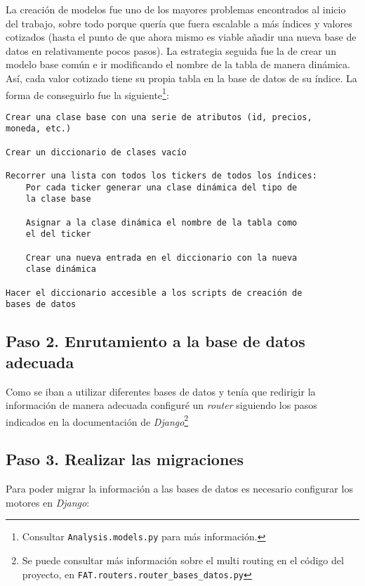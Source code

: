 La creación de modelos fue uno de los mayores problemas encontrados al inicio del trabajo, sobre todo porque quería que  fuera escalable a más índices y valores cotizados (hasta el punto de que ahora mismo es viable añadir una nueva base de datos en relativamente pocos pasos). La estrategia seguida fue la de crear un modelo base común e ir modificando el nombre de la tabla de manera dinámica. Así, cada valor cotizado tiene su propia tabla en la base de datos de su índice. La forma de conseguirlo fue la siguiente\footnote{Consultar \texttt{Analysis.models.py} para más información.}: 

\begin{verbatim}
Crear una clase base con una serie de atributos (id, precios, 
moneda, etc.)

Crear un diccionario de clases vacío

Recorrer una lista con todos los tickers de todos los índices:
    Por cada ticker generar una clase dinámica del tipo de 
    la clase base
    
    Asignar a la clase dinámica el nombre de la tabla como 
    el del ticker    

    Crear una nueva entrada en el diccionario con la nueva 
    clase dinámica

Hacer el diccionario accesible a los scripts de creación de 
bases de datos
\end{verbatim}

\subsection{Paso 2. Enrutamiento a la base de datos adecuada}

Como se iban a utilizar diferentes bases de datos y tenía que redirigir la información de manera adecuada configuré un \emph{router} siguiendo los pasos indicados en la documentación de \emph{Django}\citep{online:django_routers}\footnote{Se puede consultar más información sobre el multi routing en el código del proyecto, en \texttt{FAT.routers.router\_bases\_datos.py}}

\subsection{Paso 3. Realizar las migraciones}

Para poder migrar la información a las bases de datos es necesario configurar los motores en \emph{Django}:


